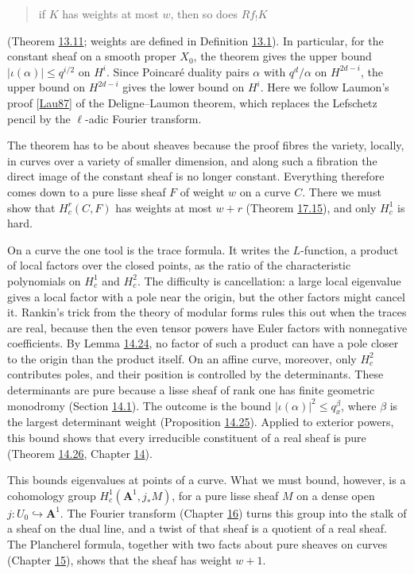 \documentclass[11pt]{article}
\begin{document}
\begin{quote}
if \(K\) has weights at most \(w\), then so does \(Rf_!K\)
\end{quote}

(Theorem \hyperref[bp38]{13.11}; weights are defined in Definition \hyperref[bp9]{13.1}). In particular, for the constant sheaf on a smooth proper \(X_0\), the theorem gives the upper bound \(|\iota(\alpha)|\le q^{i/2}\) on \(H^i\). Since Poincaré duality pairs \(\alpha\) with \(q^d/\alpha\) on \(H^{2d-i}\), the upper bound on \(H^{2d-i}\) gives the lower bound on \(H^i\). Here we follow Laumon's proof [\hyperref[bp352]{Lau87}] of the Deligne–Laumon theorem, which replaces the Lefschetz pencil by the \(\ell\)-adic Fourier transform.

The theorem has to be about sheaves because the proof fibres the variety, locally, in curves over a variety of smaller dimension, and along such a fibration the direct image of the constant sheaf is no longer constant. Everything therefore comes down to a pure lisse sheaf \(F\) of weight \(w\) on a curve \(C\). There we must show that \(H^r_c(C,F)\) has weights at most \(w+r\) (Theorem \hyperref[bp269]{17.15}), and only \(H^1_c\) is hard.

On a curve the one tool is the trace formula. It writes the \(L\)-function, a product of local factors over the closed points, as the ratio of the characteristic polynomials on \(H^1_c\) and \(H^2_c\). The difficulty is cancellation: a large local eigenvalue gives a local factor with a pole near the origin, but the other factors might cancel it. Rankin's trick from the theory of modular forms rules this out when the traces are real, because then the even tensor powers have Euler factors with nonnegative coefficients. By Lemma \hyperref[bp113]{14.24}, no factor of such a product can have a pole closer to the origin than the product itself. On an affine curve, moreover, only \(H^2_c\) contributes poles, and their position is controlled by the determinants. These determinants are pure because a lisse sheaf of rank one has finite geometric monodromy (Section \hyperref[bp41]{14.1}). The outcome is the bound \(|\iota(\alpha)|^2\le q_x^\beta\), where \(\beta\) is the largest determinant weight (Proposition \hyperref[bp116]{14.25}). Applied to exterior powers, this bound shows that every irreducible constituent of a real sheaf is pure (Theorem \hyperref[bp120]{14.26}, Chapter \hyperref[bp39]{14}).

This bounds eigenvalues at points of a curve. What we must bound, however, is a cohomology group \(H^1_c(\mathbf A^1,j_*M)\), for a pure lisse sheaf \(M\) on a dense open \(j:U_0\hookrightarrow\mathbf A^1\). The Fourier transform (Chapter \hyperref[bp167]{16}) turns this group into the stalk of a sheaf on the dual line, and a twist of that sheaf is a quotient of a real sheaf. The Plancherel formula, together with two facts about pure sheaves on curves (Chapter \hyperref[bp122]{15}), shows that the sheaf has weight \(w+1\).
\end{document}
